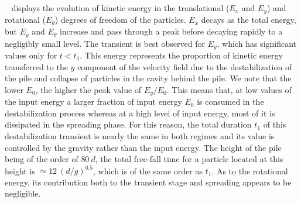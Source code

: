 ~ displays the evolution of kinetic energy 
in the translational ($E_x$ and $E_y$) and rotational ($E_\theta$) 
degrees of freedom of the particles. $E_x$ decays as the total 
energy, but $E_y$ and $E_\theta$ increase and pass through a peak before 
decaying rapidly to a negligibly small level. The transient is best observed 
for $E_y$, which has significant values only for $t< t_1$. This energy 
represents the proportion of kinetic energy transferred to the $y$ component of 
the velocity field  due to the destabilization of the pile and collapse of 
particles in the cavity behind the pile. We note that the lower $E_0$, the 
higher the peak value of $E_y/E_0$. 
This means that, at low values of the input energy a larger fraction 
of input energy $E_0$ is consumed in the destabilization process whereas 
at a high level of input energy, most of it is dissipated in the spreading 
phase. For this reason, the total duration $t_1$ of this destabilization 
transient is nearly the same in both regimes and its value is controlled by the 
gravity rather than the input energy. The height of the pile being of the order 
of $80 \ d$, the total free-fall time for a particle located at this height is 
$\simeq 12 \ (d/g)^{0.5}$, which is of the same order as $t_1$. As to the 
rotational energy, its contribution both to the transient stage and spreading 
appears to be negligible. 


